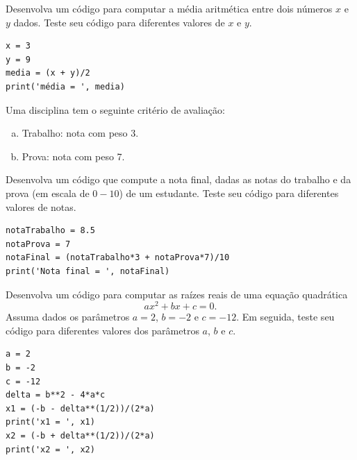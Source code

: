 \begin{exer}
  Desenvolva um código {\python} para computar a média aritmética entre dois números $x$ e $y$ dados. Teste seu código para diferentes valores de $x$ e $y$.
\end{exer}
\begin{resp}

\begin{lstlisting}
x = 3
y = 9
media = (x + y)/2
print('média = ', media)
\end{lstlisting}

\end{resp}

\begin{exer}
  Uma disciplina tem o seguinte critério de avaliação:
  \begin{enumerate}[a)]
  \item Trabalho: nota com peso 3.
  \item Prova: nota com peso 7.
  \end{enumerate}
  Desenvolva um código {\python} que compute a nota final, dadas as notas do trabalho e da prova (em escala de $0 - 10$) de um estudante. Teste seu código para diferentes valores de notas.
\end{exer}
\begin{resp}

\begin{lstlisting}
notaTrabalho = 8.5
notaProva = 7
notaFinal = (notaTrabalho*3 + notaProva*7)/10
print('Nota final = ', notaFinal)
\end{lstlisting}

\end{resp}

\begin{exer}
  Desenvolva um código {\python} para computar as raízes reais de uma equação quadrática
  \begin{equation}
    ax^2 + bx + c = 0.
  \end{equation}
  Assuma dados os parâmetros $a=2$, $b=-2$ e $c=-12$. Em seguida, teste seu código para diferentes valores dos parâmetros $a$, $b$ e $c$.
\end{exer}
\begin{resp}

\begin{lstlisting}
a = 2
b = -2
c = -12
delta = b**2 - 4*a*c
x1 = (-b - delta**(1/2))/(2*a)
print('x1 = ', x1)
x2 = (-b + delta**(1/2))/(2*a)
print('x2 = ', x2)
\end{lstlisting}

\end{resp}

